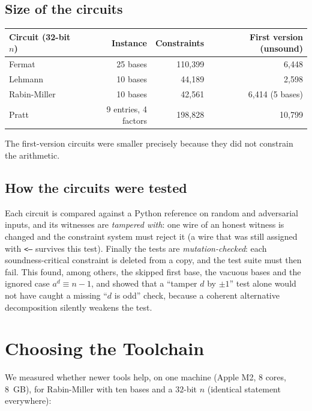 \documentclass[12pt]{article}
\begin{document}
\subsection*{Size of the circuits}

\begin{center}
\begin{tabular}{lrrr}
\hline
Circuit (32-bit $n$) & Instance & Constraints & First version (unsound) \\
\hline
Fermat & 25 bases & 110{,}399 & 6{,}448 \\
Lehmann & 10 bases & 44{,}189 & 2{,}598 \\
Rabin-Miller & 10 bases & 42{,}561 & 6{,}414 (5 bases) \\
Pratt & 9 entries, 4 factors & 198{,}828 & 10{,}799 \\
\hline
\end{tabular}
\end{center}
The first-version circuits were smaller precisely because they did not constrain the arithmetic.

\subsection*{How the circuits were tested}

Each circuit is compared against a Python reference on random and adversarial inputs, and its witnesses are \emph{tampered with}: one wire of an honest witness is changed and the constraint system must reject it (a wire that was still assigned with \texttt{<--} survives this test). Finally the tests are \emph{mutation-checked}: each soundness-critical constraint is deleted from a copy, and the test suite must then fail. This found, among others, the skipped first base, the vacuous bases and the ignored case $a^d\equiv n-1$, and showed that a ``tamper $d$ by $\pm 1$'' test alone would not have caught a missing ``$d$ is odd'' check, because a coherent alternative decomposition silently weakens the test.

\section{Choosing the Toolchain}

We measured whether newer tools help, on one machine (Apple M2, 8 cores, 8~GB), for Rabin-Miller with ten bases and a $32$-bit $n$ (identical statement everywhere):
\end{document}
